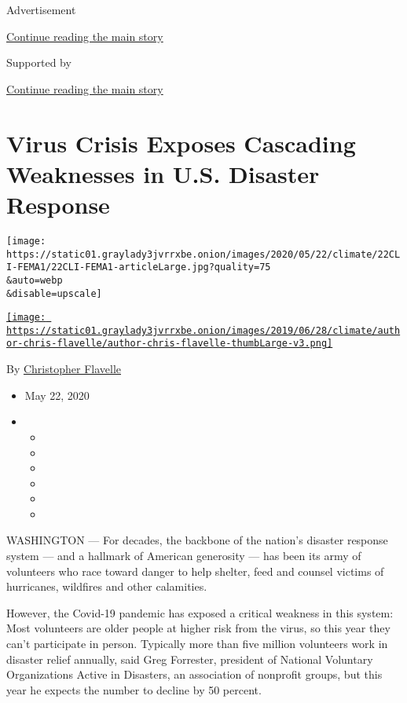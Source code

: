 Advertisement

\protect\hyperlink{after-top}{Continue reading the main story}

Supported by

\protect\hyperlink{after-sponsor}{Continue reading the main story}

\hypertarget{virus-crisis-exposes-cascading-weaknesses-in-us-disaster-response}{%
\section{Virus Crisis Exposes Cascading Weaknesses in U.S. Disaster
Response}\label{virus-crisis-exposes-cascading-weaknesses-in-us-disaster-response}}

\texttt{[image: https://static01.graylady3jvrrxbe.onion/images/2020/05/22/climate/22CLI-FEMA1/22CLI-FEMA1-articleLarge.jpg?quality=75\\\&auto=webp\\\&disable=upscale]}

\href{https://www.nytimes3xbfgragh.onion/by/christopher-flavelle}{\texttt{[image: https://static01.graylady3jvrrxbe.onion/images/2019/06/28/climate/author-chris-flavelle/author-chris-flavelle-thumbLarge-v3.png]}}

By
\href{https://www.nytimes3xbfgragh.onion/by/christopher-flavelle}{Christopher
Flavelle}

\begin{itemize}
\item
  May 22, 2020
\item
  \begin{itemize}
  \item
  \item
  \item
  \item
  \item
  \item
  \end{itemize}
\end{itemize}

WASHINGTON --- For decades, the backbone of the nation's disaster
response system --- and a hallmark of American generosity --- has been
its army of volunteers who race toward danger to help shelter, feed and
counsel victims of hurricanes, wildfires and other calamities.

However, the Covid-19 pandemic has exposed a critical weakness in this
system: Most volunteers are older people at higher risk from the virus,
so this year they can't participate in person. Typically more than five
million volunteers work in disaster relief annually, said Greg
Forrester, president of National Voluntary Organizations Active in
Disasters, an association of nonprofit groups, but this year he expects
the number to decline by 50 percent.

